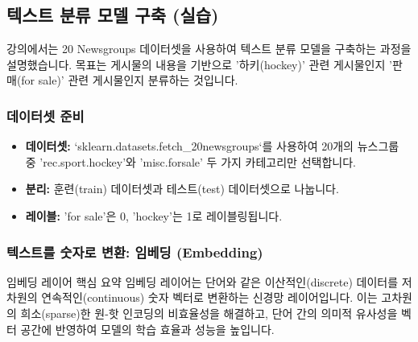 \documentclass[11pt,a4paper]{article}
\begin{document}
\subsection{텍스트 분류 모델 구축 (실습)}
강의에서는 20 Newsgroups 데이터셋을 사용하여 텍스트 분류 모델을 구축하는 과정을 설명했습니다. 목표는 게시물의 내용을 기반으로 '하키(hockey)' 관련 게시물인지 '판매(for sale)' 관련 게시물인지 분류하는 것입니다.

\subsubsection{데이터셋 준비}
\begin{itemize}
    \item \textbf{데이터셋:} `sklearn.datasets.fetch_20newsgroups`를 사용하여 20개의 뉴스그룹 중 'rec.sport.hockey'와 'misc.forsale' 두 가지 카테고리만 선택합니다.
    \item \textbf{분리:} 훈련(train) 데이터셋과 테스트(test) 데이터셋으로 나눕니다.
    \item \textbf{레이블:} 'for sale'은 0, 'hockey'는 1로 레이블링됩니다.
\end{itemize}

\subsubsection{텍스트를 숫자로 변환: 임베딩 (Embedding)}
\begin{summarybox}{임베딩 레이어 핵심 요약}
임베딩 레이어는 단어와 같은 이산적인(discrete) 데이터를 저차원의 연속적인(continuous) 숫자 벡터로 변환하는 신경망 레이어입니다. 이는 고차원의 희소(sparse)한 원-핫 인코딩의 비효율성을 해결하고, 단어 간의 의미적 유사성을 벡터 공간에 반영하여 모델의 학습 효율과 성능을 높입니다.
\end{summarybox}
\end{document}
